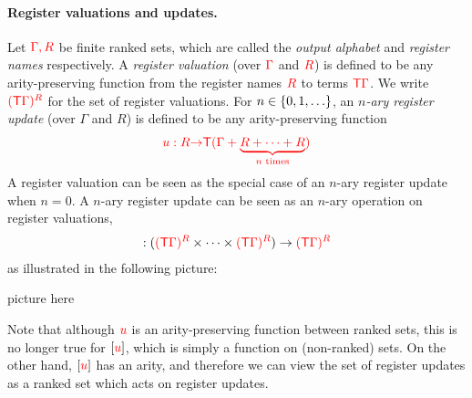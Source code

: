 \paragraph*{Register valuations and updates.}   Let ${\color{red}{\Gamma, R}}$ be finite ranked sets, which are called the \emph{output alphabet} and \emph{register names} respectively.  
A \emph{register valuation} (over ${\color{red}{\Gamma}}$ and ${\color{red}{R}}$) is defined to be any arity-preserving function from the register names ${{\color{red}{R}}}$ to terms ${\color{red}{\mathsf T}} {\color{red}{\Gamma}}$. We write ${\color{red}{({\color{red}{\mathsf T}}{\color{red}{\Gamma}})^{{{\color{red}{R}}}}}}$ for the set of register valuations. For  $n \in \{0,1,\ldots\}$, an \emph{$n$-ary register update} (over $\Gamma$ and $R$) is defined to be any arity-preserving function
\begin{align*}
    {\color{red}{u : {{\color{red}{R}}}{\color{red}{\to}}{\color{red}{\mathsf T}}( {\color{red}{\Gamma}}+ \underbrace{{{{\color{red}{R}}}+ \cdots + {{\color{red}{R}}}}}_{\text{$n$ times}})}}
\end{align*}
A register valuation can be seen as the special case of an $n$-ary register update when $n=0$. 
A $n$-ary register update can be seen as an $n$-ary operation on  register valuations,
\begin{align*}
    [\ranked u] : (\regvals \rGamma \regnames \times \cdots \times \regvals \rGamma \regnames) \to \regvals \rGamma \regnames
\end{align*}
as illustrated in the following picture:
\begin{center}
    picture here
\end{center}
Note that although ${\color{red}{u}}$ is an arity-preserving function between ranked sets, this is no longer true for $[{\color{red}{u}}]$, which is simply a function on (non-ranked) sets. On the other hand, $[{\color{red}{u}}]$ has an arity, and therefore we can view the set of register updates as a ranked set which acts on register updates. 


